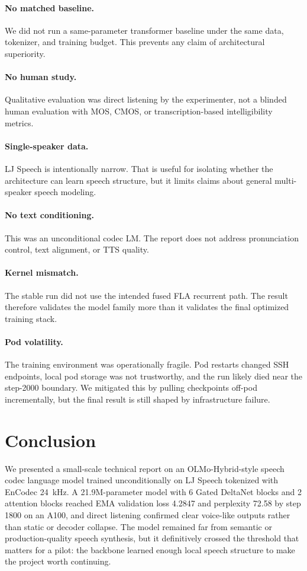 \documentclass[11pt]{article}
\begin{document}
\paragraph{No matched baseline.}
We did not run a same-parameter transformer baseline under the same data, tokenizer, and training budget. This prevents any claim of architectural superiority.

\paragraph{No human study.}
Qualitative evaluation was direct listening by the experimenter, not a blinded human evaluation with MOS, CMOS, or transcription-based intelligibility metrics.

\paragraph{Single-speaker data.}
LJ Speech is intentionally narrow. That is useful for isolating whether the architecture can learn speech structure, but it limits claims about general multi-speaker speech modeling.

\paragraph{No text conditioning.}
This was an unconditional codec LM. The report does not address pronunciation control, text alignment, or TTS quality.

\paragraph{Kernel mismatch.}
The stable run did not use the intended fused FLA recurrent path. The result therefore validates the model family more than it validates the final optimized training stack.

\paragraph{Pod volatility.}
The training environment was operationally fragile. Pod restarts changed SSH endpoints, local pod storage was not trustworthy, and the run likely died near the step-2000 boundary. We mitigated this by pulling checkpoints off-pod incrementally, but the final result is still shaped by infrastructure failure.

\section{Conclusion}
We presented a small-scale technical report on an OLMo-Hybrid-style speech codec language model trained unconditionally on LJ Speech tokenized with EnCodec 24~kHz. A 21.9M-parameter model with 6 Gated DeltaNet blocks and 2 attention blocks reached EMA validation loss 4.2847 and perplexity 72.58 by step 1800 on an A100, and direct listening confirmed clear voice-like outputs rather than static or decoder collapse. The model remained far from semantic or production-quality speech synthesis, but it definitively crossed the threshold that matters for a pilot: the backbone learned enough local speech structure to make the project worth continuing.
\end{document}
